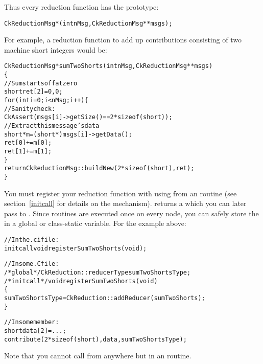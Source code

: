 Thus every reduction function has the prototype:
\begin{alltt}
CkReductionMsg *(int nMsg,CkReductionMsg **msgs);
\end{alltt}

For example, a reduction function to add up contributions 
consisting of two machine short integers would be:

\begin{alltt}
CkReductionMsg *sumTwoShorts(int nMsg,CkReductionMsg **msgs)
\{
  //Sum starts off at zero
  short ret[2]={0,0};
  for (int i=0;i<nMsg;i++) \{
    //Sanity check:
    CkAssert(msgs[i]->getSize()==2*sizeof(short));
    //Extract this message's data
    short *m=(short *)msgs[i]->getData();
    ret[0]+=m[0];
    ret[1]+=m[1];
  \}
  return CkReductionMsg::buildNew(2*sizeof(short),ret);
\}
\end{alltt}

You must register your reduction function with \charmpp{} 
using  from
an  routine (see section~\ref{initcall} for details
on the  mechanism).   
returns a  which you can later 
pass to .  Since  routines are executed
once on every node, you can safely store the 
in a global or class-static variable.  For the example above:

\begin{alltt}
//In the .ci file:
  initcall void registerSumTwoShorts(void);

//In some .C file:
/*global*/ CkReduction::reducerType sumTwoShortsType;
/*initcall*/ void registerSumTwoShorts(void)
\{
  sumTwoShortsType=CkReduction::addReducer(sumTwoShorts);
\}

//In some member:
  short data[2]=...;
  contribute(2*sizeof(short),data,sumTwoShortsType);
\end{alltt}

Note that you cannot call 
from anywhere but in an  routine.


